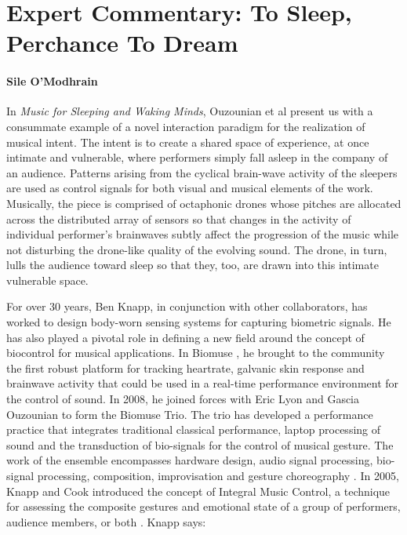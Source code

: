 \section*{Expert Commentary: To Sleep, Perchance To Dream}

\paragraph{Sile O'Modhrain}

In \textit{Music for Sleeping and Waking Minds}, Ouzounian et al present us with  a consummate example of a novel interaction paradigm for the realization of musical intent.  The intent is to create a shared space of experience, at once intimate and vulnerable, where performers simply fall asleep in the company of an audience.  Patterns arising from the cyclical brain-wave activity of the sleepers are used as control signals for both visual and musical elements of the work.  Musically, the piece is comprised of octaphonic drones whose pitches are allocated across the distributed array of sensors so that changes in the activity of individual performer's brainwaves subtly affect the progression of the music while not disturbing the drone-like quality of the evolving sound.  The drone, in turn, lulls the audience toward sleep so that they, too, are drawn into this intimate vulnerable space.  

For over 30 years, Ben Knapp, in conjunction with other collaborators,  has worked to design body-worn sensing systems for capturing biometric signals. He has also played a pivotal role in defining a new field around the concept of biocontrol for musical applications.  In Biomuse \cite{Knapp:1990}, he brought to the community the first robust platform for tracking heartrate, galvanic skin response and brainwave activity that could be used in a real-time performance environment for the control of sound. In 2008, he joined forces with Eric Lyon and Gascia Ouzounian to form the Biomuse Trio.  The trio has developed a performance practice that integrates traditional classical performance, laptop processing of sound and the transduction of bio-signals for the control of musical gesture.  The work of the ensemble encompasses hardware design, audio signal processing, bio-signal processing, composition, improvisation and gesture choreography \cite{Ortiz:2012}.  In 2005, Knapp and Cook introduced the concept of Integral Music Control, a technique for assessing the composite gestures and emotional state of a group of performers, audience members, or both \cite{Knapp:2005}. Knapp says: 

